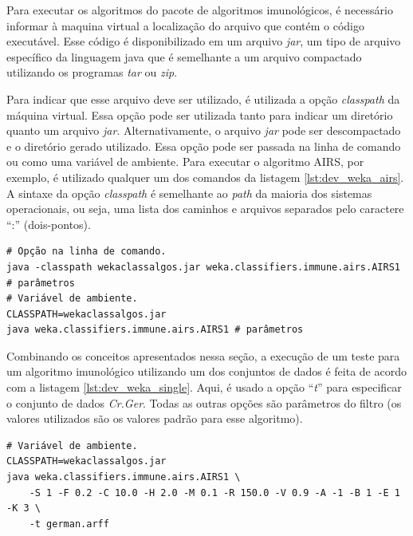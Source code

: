 Para executar os algoritmos do pacote de algoritmos imunológicos, é necessário informar à maquina virtual a localização do arquivo que contém o código executável. Esse código é disponibilizado em um arquivo \emph{jar}, um tipo de arquivo específico da linguagem java que é semelhante a um arquivo compactado utilizando os programas \emph{tar} ou \emph{zip}.

Para indicar que esse arquivo deve ser utilizado, é utilizada a opção \emph{classpath} da máquina virtual. Essa opção pode ser utilizada tanto para indicar um diretório quanto um arquivo \emph{jar}. Alternativamente, o arquivo \emph{jar} pode ser descompactado e o diretório gerado utilizado. Essa opção pode ser passada na linha de comando ou como uma variável de ambiente. Para executar o algoritmo AIRS, por exemplo, é utilizado qualquer um dos comandos da listagem \ref{lst:dev_weka_airs}. A sintaxe da opção \emph{classpath} é semelhante ao \emph{path} da maioria dos sistemas operacionais, ou seja, uma lista dos caminhos e arquivos separados pelo caractere ``:'' (dois-pontos).

\vspace{0.5cm}
\begin{lstlisting}[caption=Execução de um algoritmo do pacote de algoritmos imunológicos, label=lst:dev_weka_airs]
# Opção na linha de comando.
java -classpath wekaclassalgos.jar weka.classifiers.immune.airs.AIRS1 # parâmetros
# Variável de ambiente.
CLASSPATH=wekaclassalgos.jar
java weka.classifiers.immune.airs.AIRS1 # parâmetros
\end{lstlisting}
\vspace{0.5cm}

Combinando os conceitos apresentados nessa seção, a execução de um teste para um algoritmo imunológico utilizando um dos conjuntos de dados é feita de acordo com a listagem \ref{lst:dev_weka_single}. Aqui, é usado a opção ``\emph{t}'' para especificar o conjunto de dados \emph{Cr.Ger}. Todas as outras opções são parâmetros do filtro (os valores utilizados são os valores padrão para esse algoritmo).

\vspace{0.5cm}
\begin{lstlisting}[caption=Execução de um algoritmo do pacote de algoritmos imunológicos utilizando um dos conjuntos de dados, label=lst:dev_weka_single]
# Variável de ambiente.
CLASSPATH=wekaclassalgos.jar
java weka.classifiers.immune.airs.AIRS1 \
    -S 1 -F 0.2 -C 10.0 -H 2.0 -M 0.1 -R 150.0 -V 0.9 -A -1 -B 1 -E 1 -K 3 \
    -t german.arff
\end{lstlisting}
\vspace{0.5cm}

